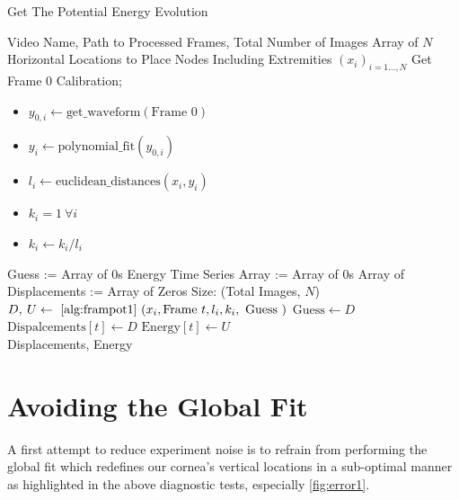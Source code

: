 \documentclass[epjST]{svjour}
\begin{document}
\begin{algorithm}
\label{alg:potev1}
    \caption{Get The Potential Energy Evolution}
    \begin{algorithmic}[1]
        \Require Video Name, Path to Processed Frames, Total Number of Images
        \Require Array of $N$ Horizontal Locations to Place Nodes Including Extremities $(x_i)_{i=1...,N}$
        \State Get Frame 0 Calibration; \begin{itemize}
            \item $y_{0,i} \gets \text{get\_waveform}(\text{Frame 0})$
            \item $y_i\gets \text{polynomial\_fit}(y_{0,i})$
            \item $l_i\gets \text{euclidean\_distances}(x_i,y_i)$
            \item $k_i = 1\: \forall i$
            \item $k_i \gets k_i/l_i$
        \end{itemize}
        \State Guess := Array of 0s
        \State Energy Time Series Array := Array of 0s
        \State Array of Displacements := Array of Zeros Size: (Total Images, $N$)
        \State $D,\:U\gets \text{ \autoref{alg:frampot1} }(x_i, \text{Frame $t$}, l_i, k_i, \text{ Guess })$
        \State $\text{Guess} \gets D$
        \State $\text{Dispalcements}[t]\gets D$
        \State $\text{Energy}[t]\gets U$
        \EndFor
        \\
        \Return Displacements, Energy
    \end{algorithmic}
\end{algorithm}
\section{Avoiding the Global Fit}
A first attempt to reduce experiment noise is to refrain from performing the global fit which redefines our cornea's vertical locations in a sub-optimal manner as highlighted in the above diagnostic tests, especially \autoref{fig:error1}. 
\end{document}
